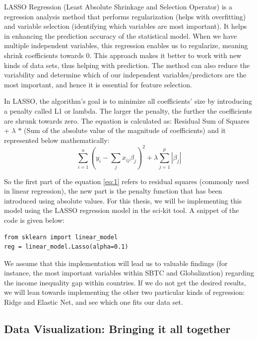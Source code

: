 \documentclass[12pt,oneside]{book} %
\begin{document}
\hspace{20pt}LASSO Regression (Least Absolute Shrinkage and Selection Operator) is a regression analysis method that performs regularization (helps with overfitting) and variable selection (identifying which variables are most important). It helps in enhancing the prediction accuracy of the statistical model. When we have multiple independent variables, this regression enables us to regularize, meaning shrink coefficients towards 0. This approach makes it better to work with new kinds of data sets, thus helping with prediction. The method can also reduce the variability and determine which of our independent variables/predictors are the most important, and hence it is essential for feature selection.

In LASSO, the algorithm's goal is to minimize all coefficients' size by introducing a penalty called L1 or lambda. The larger the penalty, the further the coefficients are shrunk towards zero. The equation is calculated as: Residual Sum of Squares + $\lambda$ $*$ (Sum of the absolute value of the magnitude of coefficients) and it represented below mathematically:
\begin{equation} \label{eq:1}
    \sum_{i=1}^{n}(y_i - \sum_{j}^{}x_{ij}\beta_{j})^2 + \lambda\sum_{j=1}^{p}|\beta_{j}|
\end{equation}

So the first part of the equation \ref{eq:1} refers to residual squares (commonly used in linear regression), the new part is the penalty function that has been introduced using absolute values. For this thesis, we will be implementing this model using the LASSO regression model in the sci-kit tool. A snippet of the code is given below: 

\begin{verbatim} 
from sklearn import linear_model 
reg = linear_model.Lasso(alpha=0.1)
\end{verbatim}  

We assume that this implementation will lead us to valuable findings (for instance, the most important variables within SBTC and Globalization) regarding the income inequality gap within countries. If we do not get the desired results, we will lean towards implementing the other two particular kinds of regression: Ridge and Elastic Net, and see which one fits our data set.

\subsection{Data Visualization: Bringing it all together}
\end{document}
